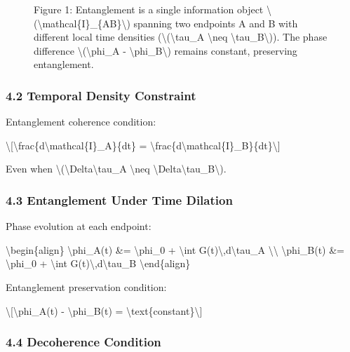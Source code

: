 \documentclass[
  10pt,
]{article}
\begin{document}
\begin{figure}
\centering

\caption{Figure 1: Entanglement is a single information object
\textbackslash(\textbackslash mathcal\{I\}\_\{AB\}\textbackslash)
spanning two endpoints A and B with different local time densities
(\textbackslash(\textbackslash tau\_A \textbackslash neq
\textbackslash tau\_B\textbackslash)). The phase difference
\textbackslash(\textbackslash phi\_A -
\textbackslash phi\_B\textbackslash) remains constant, preserving
entanglement.}
\end{figure}

\hypertarget{temporal-density-constraint}{%
\subsubsection{4.2 Temporal Density
Constraint}\label{temporal-density-constraint}}

Entanglement coherence condition:

\textbackslash{[}\textbackslash frac\{d\textbackslash mathcal\{I\}\_A\}\{dt\}
=
\textbackslash frac\{d\textbackslash mathcal\{I\}\_B\}\{dt\}\textbackslash{]}

Even when \textbackslash(\textbackslash Delta\textbackslash tau\_A
\textbackslash neq
\textbackslash Delta\textbackslash tau\_B\textbackslash).

\hypertarget{entanglement-under-time-dilation}{%
\subsubsection{4.3 Entanglement Under Time
Dilation}\label{entanglement-under-time-dilation}}

Phase evolution at each endpoint:

\textbackslash begin\{align\} \textbackslash phi\_A(t) \&=
\textbackslash phi\_0 + \textbackslash int
G(t)\textbackslash,d\textbackslash tau\_A \textbackslash\textbackslash{}
\textbackslash phi\_B(t) \&= \textbackslash phi\_0 + \textbackslash int
G(t)\textbackslash,d\textbackslash tau\_B \textbackslash end\{align\}

Entanglement preservation condition:

\textbackslash{[}\textbackslash phi\_A(t) - \textbackslash phi\_B(t) =
\textbackslash text\{constant\}\textbackslash{]}

\hypertarget{decoherence-condition}{%
\subsubsection{4.4 Decoherence Condition}\label{decoherence-condition}}
\end{document}
